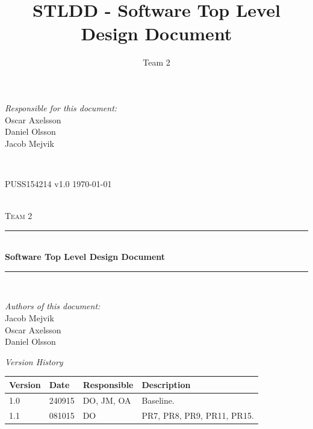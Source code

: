 \documentclass[a4paper]{article}
\title{STLDD - Software Top Level Design Document}
\author{Team 2}
\begin{document}
	\begin{titlepage}
		\newcommand{\HRule}{\rule{\linewidth}{0.5mm}}
		
		\begin{minipage}{0.5\textwidth}
			\begin{flushleft} %
				\textit{Responsible for this document:}\\
				Oscar Axelsson \\
				Daniel Olsson \\
				Jacob Mejvik
			\end{flushleft}
		\end{minipage}
		~
		\begin{minipage}{0.4\textwidth}
			\begin{flushright}
				PUSS154214 v1.0
				\today
			\end{flushright}
		\end{minipage}\\[3cm]
		
		\centering
		\textsc{\LARGE Team 2}\\[0.5cm]
		
		\HRule \\[0.4cm]
		{ \huge \bfseries Software Top Level Design Document}\\[0.4cm] %
		\HRule \\[1.5cm]
		
		\vfill
		\begin{flushleft}
			\textit{Authors of this document:}\\
			Jacob Mejvik \\
			Oscar Axelsson \\
			Daniel Olsson
		\end{flushleft}
		
	\end{titlepage}
	\setcounter{tocdepth}{2}
	
	\begin{center}
		\textit{\large Version History}
		
		\begin{tabular}{ | l | l | l | p{5cm} |}
			\hline
			\textbf{Version} 	& \textbf{Date} 	& \textbf{Responsible} 	& \textbf{Description} 		\\ \hline
			1.0				 	& 240915 			& DO, JM, OA			&  Baseline. 				\\ \hline
			1.1 			 	& 081015 			& DO					&  PR7, PR8, PR9, PR11, PR15. \\ \hline			
		\end{tabular}
	\end{center}
	
\end{document}
